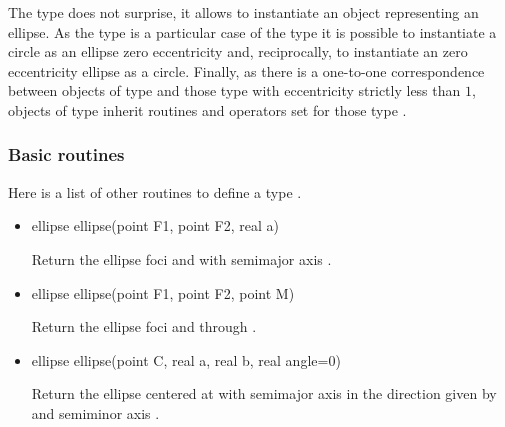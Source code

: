 \documentclass[pdftex]{article}
\begin{document}
The type  does not surprise, it allows to
instantiate an object representing an ellipse.
As the type  is a particular case of the type
 it is possible to instantiate a circle as an ellipse zero eccentricity
and, reciprocally, to instantiate an zero eccentricity ellipse as a
circle.
Finally, as there is a one-to-one correspondence between objects of
type  and those type  with eccentricity
strictly less than $1$, objects of type  inherit
routines and operators set for those type .

\subsubsection{Basic routines}
Here is a list of other routines to define a type .
\begin{itemize}
\item {}
  \begin{Vcolor}
    ellipse ellipse(point F1, point F2, real a)
  \end{Vcolor}
  Return the ellipse foci  and  with semimajor axis .
\item {}
  \begin{Vcolor}
    ellipse ellipse(point F1, point F2, point M)
  \end{Vcolor}
  Return the ellipse foci  and  through .
\item {}
  \begin{Vcolor}
    ellipse ellipse(point C, real a, real b, real angle=0)
  \end{Vcolor}
  Return the ellipse centered at  with semimajor
  axis  in the direction given by  and
  semiminor axis .
\end{itemize}
\end{document}
